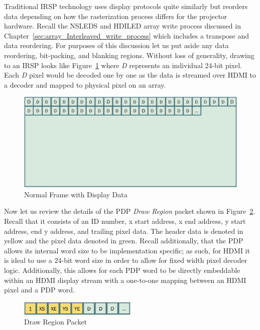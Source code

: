     Traditional IRSP technology uses display protocols quite similarly but reorders data depending on how the rasterization process differs for the projector hardware. Recall the NSLEDS and HDILED array write process discussed in Chapter~\ref{sec:array_Interleaved_write_process} which includes a transpose and data reordering. For purposes of this discussion let us put aside any data reordering, bit-packing, and blanking regions. Without loss of generality, drawing to an IRSP looks like Figure~\ref{fig:classic_video} where {\it D} represents an individual 24-bit pixel. Each {\it D} pixel would be decoded one by one as the data is streamed over HDMI to a decoder and mapped to physical pixel on an array.

    \begin{figure}
        \centering
        \includegraphics[width=1.0\textwidth]{fig/classic_video.pdf}
        \caption{Normal Frame with Display Data}
        \label{fig:classic_video}
    \end{figure}

    Now let us review the details of the PDP {\it Draw Region} packet shown in Figure~\ref{fig:packet_refresher}. Recall that it consists of an ID number, x start address, x end address, y start address, end y address, and trailing pixel data. The header data is denoted in yellow and the pixel data denoted in green. Recall additionally, that the PDP allows its internal word size to be implementation specific; as such, for HDMI it is ideal to use a 24-bit word size in order to allow for fixed width pixel decoder logic. Additionally, this allows for each PDP word to be directly embeddable within an HDMI display stream with a one-to-one mapping between an HDMI pixel and a PDP word.

    \begin{figure}
        \centering
        \includegraphics[width=0.5\textwidth]{fig/packet_refresher.pdf}
        \caption{Draw Region Packet}
        \label{fig:packet_refresher}
    \end{figure}

